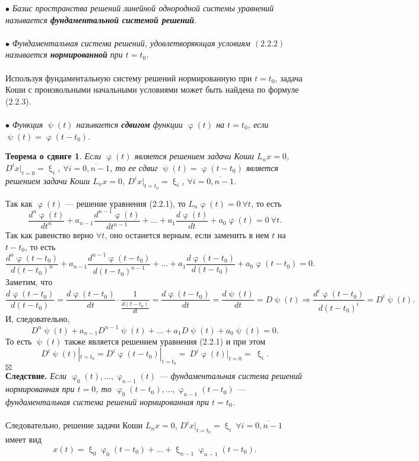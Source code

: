 \documentclass[a4paper, 12pt]{report}
\newenvironment{Proof} %
{\par\noindent{$\blacklozenge$}} %
{\hfill$\scriptstyle\boxtimes$}
\renewcommand{\varphi}{\upvarphi}
\renewcommand{\psi}{\uppsi}
\renewcommand{\xi}{\upxi}
\begin{document}
	$\bullet$ \textit{Базис пространства решений линейной однородной системы уравнений называется \textbf{фундаментальной системой решений}}.\\\\
	$\bullet$ \textit{Фундаментальная система решений, удовлетворяющая условиям $(2.2.2)$ называется \textbf{нормированной} при $t = t_0$.}\\\\
	Используя фундаментальную систему решений нормированную при $t=t_0$, задача Коши с произвольными начальными условиями может быть найдена по формуле (2.2.3).\\\\
	$\bullet$ \textit{Функция $\psi(t)$ называется \textbf{сдвигом} функции $\varphi(t)$ на $t=t_0$, если $\psi(t) = \varphi(t-t_0)$.}
	\newtheorem*{2_2_4}{Теорема о сдвиге}\begin{2_2_4}
		Если $\varphi(t)$ является решением задачи Коши $L_nx = 0$, $D^ix|_{t=0} = \xi_i$, $\forall i = \overline{0,n-1}$, то ее сдвиг $\psi(t) = \varphi(t-t_0)$ является решением задачи Коши  $L_nx = 0$, $D^ix|_{t=t_0} = \xi_i$, $\forall i = \overline{0,n-1}$.
	\end{2_2_4}\begin{Proof}
		Так как $\varphi(t)$ --- решение уравнения (2.2.1), то $L_n\varphi(t) = 0\ \forall t$, то есть $$\dfrac{d^n\varphi(t)}{dt^n}+a_{n-1}\dfrac{d^{n-1}\varphi(t)}{dt^{n-1}} + \ldots + a_1\dfrac{d\varphi(t)}{dt} + a_0 \varphi(t) = 0\ \forall t.$$
		Так как равенство верно $\forall t$, оно останется верным, если заменить в нем $t$ на $t-t_0$, то есть
		$$\dfrac{d^n\varphi(t-t_0)}{d(t-t_0)^n}+a_{n-1}\dfrac{d^{n-1}\varphi(t-t_0)}{d(t-t_0)^{n-1}} + \ldots + a_1\dfrac{d\varphi(t-t_0)}{d(t-t_0)} + a_0 \varphi(t-t_0) = 0.$$ Заметим, что $$\dfrac{d\varphi(t-t_0)}{d(t-t_0)} = \dfrac{d\varphi(t-t_0)}{dt} \cdot \dfrac{1}{\frac{d(t-t_0)}{dt}} = \dfrac{d\varphi(t-t_0)}{dt} = \dfrac{d\psi(t)}{dt} = D\psi(t)\Rightarrow\dfrac{d^i\varphi(t-t_0)}{d(t-t_0)^i} = D^i\psi(t).$$ И, следовательно, $$D^n\psi(t) + a_{n-1}D^{n-1}\psi(t) + \ldots + a_1D\psi(t) + a_0\psi(t) = 0.$$ То есть $\psi(t)$ также является решением уравнения (2.2.1) и при этом $$D^i\psi(t)|_{t=t_0} = D^i\varphi(t-t_0)|_{t=t_0} =~D^i\varphi(t)|_{t=0} =~\xi_i.$$\end{Proof}\\
	\textbf{Следствие.} \textit{Если $\varphi_0(t),\ldots,\varphi_{n-1}(t)$ --- фундаментальная система решений нормированная при $t=0$, то $\varphi_0(t-t_0),\ldots,\varphi_{n-1}(t-t_0)$ --- фундаментальная система решений нормированная при $t=t_0$.}\\\\
	Следовательно, решение задачи Коши $L_nx = 0$, $D^ix|_{t=t_0} = \xi_i\ \forall i = \overline{0,n-1}$ имеет вид $$x(t) = \xi_0\varphi_0(t-t_0) + \ldots + \xi_{n-1}\varphi_{n-1}(t-t_0).$$
\end{document}
